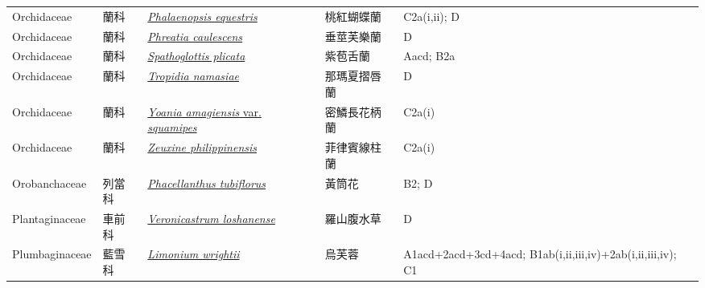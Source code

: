 {\begin{longtable}{p{2.5cm}p{2cm}p{5cm}p{2.5cm}p{3cm}}
    Orchidaceae & 蘭科 & \href{http://www.theplantlist.org/tpl1.1/search?q=Phalaenopsis+equestris}{\textit{Phalaenopsis equestris} } & 桃紅蝴蝶蘭 & C2a(i,ii); D \index{Phalaenopsis@\textit{Phalaenopsis}!equestris@\textit{equestris}}  \index{桃紅蝴蝶蘭} \\
    Orchidaceae & 蘭科 & \href{http://www.theplantlist.org/tpl1.1/search?q=Phreatia+caulescens}{\textit{Phreatia caulescens} } & 垂莖芙樂蘭 & D \index{Phreatia@\textit{Phreatia}!caulescens@\textit{caulescens}}  \index{垂莖芙樂蘭} \\
    Orchidaceae & 蘭科 & \href{http://www.theplantlist.org/tpl1.1/search?q=Spathoglottis+plicata}{\textit{Spathoglottis plicata} } & 紫苞舌蘭 & Aacd; B2a \index{Spathoglottis@\textit{Spathoglottis}!plicata@\textit{plicata}}  \index{紫苞舌蘭} \\
    Orchidaceae & 蘭科 & \href{http://www.theplantlist.org/tpl1.1/search?q=Tropidia+namasiae}{\textit{Tropidia namasiae} } & 那瑪夏摺唇蘭 & D \index{Tropidia@\textit{Tropidia}!namasiae@\textit{namasiae}}  \index{那瑪夏摺唇蘭} \\
    Orchidaceae & 蘭科 & \href{http://www.theplantlist.org/tpl1.1/search?q=Yoania+amagiensis+var.+squamipes}{\textit{Yoania amagiensis} var. \textit{squamipes} } & 密鱗長花柄蘭 & C2a(i) \index{Yoania@\textit{Yoania}!amagiensis@\textit{amagiensis}!var. squamipes@var. \textit{squamipes}}  \index{密鱗長花柄蘭} \\
    Orchidaceae & 蘭科 & \href{http://www.theplantlist.org/tpl1.1/search?q=Zeuxine+philippinensis}{\textit{Zeuxine philippinensis} } & 菲律賓線柱蘭 & C2a(i) \index{Zeuxine@\textit{Zeuxine}!philippinensis@\textit{philippinensis}}  \index{菲律賓線柱蘭} \\
    Orobanchaceae & 列當科 & \href{http://www.theplantlist.org/tpl1.1/search?q=Phacellanthus+tubiflorus}{\textit{Phacellanthus tubiflorus} } & 黃筒花 & B2; D \index{Phacellanthus@\textit{Phacellanthus}!tubiflorus@\textit{tubiflorus}}  \index{黃筒花} \\
    Plantaginaceae & 車前科 & \href{http://www.theplantlist.org/tpl1.1/search?q=Veronicastrum+loshanense}{\textit{Veronicastrum loshanense} } & 羅山腹水草 & D \index{Veronicastrum@\textit{Veronicastrum}!loshanense@\textit{loshanense}}  \index{羅山腹水草} \\
    Plumbaginaceae & 藍雪科 & \href{http://www.theplantlist.org/tpl1.1/search?q=Limonium+wrightii}{\textit{Limonium wrightii} } & 烏芙蓉 & A1acd+2acd+3cd+4acd; B1ab(i,ii,iii,iv)+2ab(i,ii,iii,iv); C1 \index{Limonium@\textit{Limonium}!wrightii@\textit{wrightii}}  \index{烏芙蓉} \\

\end{longtable}}
